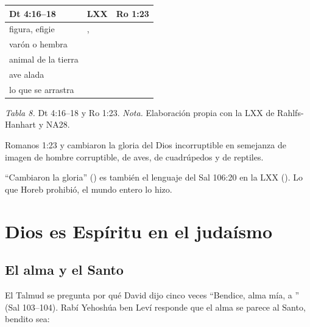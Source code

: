 \begin{center}\small\renewcommand{\arraystretch}{1.2}
\begin{tabular}{@{}L{3.6cm}L{5.2cm}L{5.2cm}@{}}
\toprule
\textbf{Dt 4:16--18} & \textbf{LXX} & \textbf{Ro 1:23} \\ \midrule
figura, efigie & ,  &  \\
varón o hembra &  &  \\
animal de la tierra &  &  \\
ave alada &  &  \\
lo que se arrastra &  &  \\
\bottomrule
\end{tabular}\par
{\footnotesize\color{gris}\textit{Tabla 8.} Dt 4:16--18 y Ro 1:23. \textit{Nota.} Elaboración propia con la LXX de Rahlfs-Hanhart y NA28.}
\end{center}

\begin{verso}{Romanos 1:23}
y cambiaron la gloria del Dios incorruptible en semejanza de imagen de hombre corruptible, de aves, de cuadrúpedos y de reptiles.
\end{verso}

``Cambiaron la gloria'' () es también el lenguaje del Sal 106:20 en la LXX (). Lo que Horeb prohibió, el mundo entero lo hizo.


\section{Dios es Espíritu en el judaísmo}\label{sec:judaismo-esp}

\subsection{El alma y el Santo}

El Talmud se pregunta por qué David dijo cinco veces ``Bendice, alma mía, a \SENOR'' (Sal 103--104). Rabí Yehoshúa ben Leví responde que el alma se parece al Santo, bendito sea:

